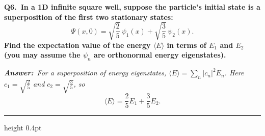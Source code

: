 \documentclass[11pt]{article}
\newcommand{\QuestionStyle}[1]{{\large\bfseries\boldmath #1}}
\newcommand{\OEBlock}[3]{%
  \Needspace{5\baselineskip}%
  \noindent
  \begin{minipage}{\linewidth}
    \QuestionStyle{#1.~#2}

    \vspace{0.25em}
    \noindent\textcolor{AnsRed}{\textit{\textbf{Answer:}~#3}}

    \vspace{0.25em}
    \hrule height 0.4pt
  \end{minipage}
  \vspace{0.75em}
}
\begin{document}
\OEBlock{Q6}{In a 1D infinite square well, suppose the particle's initial state is a superposition of the first two stationary states:
\[
\Psi(x,0)=\sqrt{\frac{2}{5}}\,\psi_1(x)+\sqrt{\frac{3}{5}}\,\psi_2(x).
\]
Find the expectation value of the energy $\langle E\rangle$ in terms of $E_1$ and $E_2$ (you may assume the $\psi_n$ are orthonormal energy eigenstates).}{For a superposition of energy eigenstates, $\langle E\rangle=\sum_n |c_n|^2E_n$. Here $c_1=\sqrt{\tfrac{2}{5}}$ and $c_2=\sqrt{\tfrac{3}{5}}$, so
\[
\langle E\rangle=\frac{2}{5}E_1+\frac{3}{5}E_2.
\]}
\end{document}
